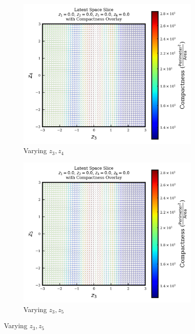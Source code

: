 \documentclass{article}
\begin{document}
\begin{figure}[H]
    \begin{subfigure}{0.3\textwidth}
        \includegraphics[width=\linewidth]{figures/VAEmodels/model5/varying_z3_z4_fixed_z1=0.0_z2=0.0_z5=0.0_z6=0.0.png}
        \caption{Varying $z_3, z_4$}
    \end{subfigure}
    \hfill
    \begin{subfigure}{0.3\textwidth}
        \includegraphics[width=\linewidth]{figures/VAEmodels/model5/varying_z3_z5_fixed_z1=0.0_z2=0.0_z4=0.0_z6=0.0.png}
        \caption{Varying $z_3, z_5$}

\end{subfigure}
\end{figure}
\end{document}
